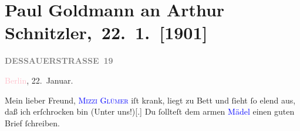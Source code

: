 

\renewcommand{\erwaehntePersonen}{Personen: Richard Beer-Hofmann, Otto Brahm, Marie Glümer, Alfred Kerr, Leopoldine Müller, Olga Schnitzler, Stefan Vacano}
\renewcommand{\erwaehnteInstitutionen}{Institutionen: Deutsches Theater Berlin}
\renewcommand{\erwaehnteOrte}{Orte: Berlin, Dessauer Straße, Wien}
\renewcommand{\erwaehnteWerke}{Werke: Der Tag, Marionetten, Michael Kramer. Drama, Neue Freie Presse, »Michael Kramer.«}
\section[ Paul Goldmann an Arthur Schnitzler, 22. 1. {[}1901{]}]{Paul Goldmann an Arthur Schnitzler, 22. 1. {[}1901{]}}
\nopagebreak{}
\rehead{ }\normalsize\beginnumbering{}
\toendnotes[C]{\smallbreak\pagebreak[2]}
\toendnotes[C]{\smallbreak}
\pstart
           \noindent{}\raggedleft{}{\pb}\textcolor{pink}{\textcolor{gray}{\textbf{DESSAUERSTRASSE 19}}}{}\ledrightnote{\textcolor{pink}{Dessauer Straße}}\pend
           
\pstart
           \textcolor{pink}{Berlin}{}\ledrightnote{\textcolor{pink}{Berlin}}, 22. Januar.\pend
           
\pstart\center{}Mein lieber Freund,\pend
\pstart
           \textsc{\textcolor{blue}{Mizzi Glümer}{}\ledrightnote{\textcolor{blue}{Marie Glümer}}} iſt krank, liegt zu Bett und ſieht ſo elend aus, daß ich erſchrocken bin (Unter
                  uns!){[}.{]} Du ſollteſt dem armen \textcolor{blue}{Mädel}{}\ledrightnote{{$\rightarrow$}\textcolor{blue}{Marie Glümer}} einen guten Brief ſchreiben.\pend
           
